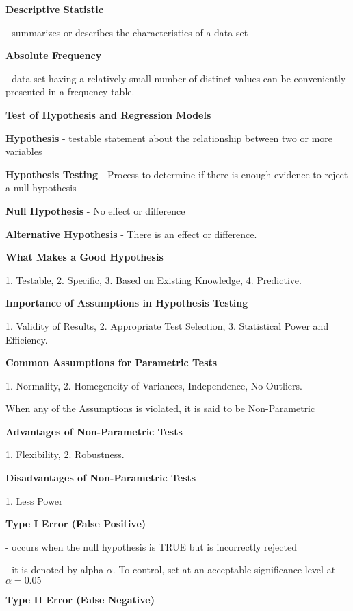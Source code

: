 \documentclass[6pt]{article}
\begin{document}
\begin{multicols*}{2}

    \textbf{Descriptive Statistic} 

    - summarizes or describes the characteristics of a data set

    \textbf{Absolute Frequency}

    - data set having a relatively small number of distinct values can be conveniently presented in a frequency table.
    
    \textbf{Test of Hypothesis and Regression Models}
    
    \textbf{Hypothesis} - testable statement about the relationship between two or more variables

    \textbf{Hypothesis Testing} - Process to determine if there is enough evidence to reject 
    a null hypothesis

    \textbf{Null Hypothesis} - No effect or difference

    \textbf{Alternative Hypothesis} - There is an effect or 
    difference.
    
    \textbf{What Makes a Good Hypothesis}
    
    1. Testable, 2. Specific, 3. Based on Existing Knowledge, 4. Predictive.

    \textbf{Importance of Assumptions in Hypothesis Testing}

    1. Validity of Results, 2. Appropriate Test Selection, 3. Statistical Power and Efficiency.

    \textbf{Common Assumptions for Parametric Tests}

    1. Normality, 2. Homegeneity of Variances, Independence, No Outliers.

    When any of the Assumptions is violated, it is said to be Non-Parametric
   
    \textbf{Advantages of Non-Parametric Tests}

    1. Flexibility, 2. Robustness.

    \textbf{Disadvantages of Non-Parametric Tests}

    1. Less Power

    \textbf{Type I Error (False Positive)}
    
    - occurs when the null hypothesis is TRUE but is incorrectly rejected

    - it is denoted by alpha $\alpha$. To control, set at an acceptable significance level at $\alpha = 0.05$
    
    \textbf{Type II Error (False Negative)}


\end{multicols*}
\end{document}
